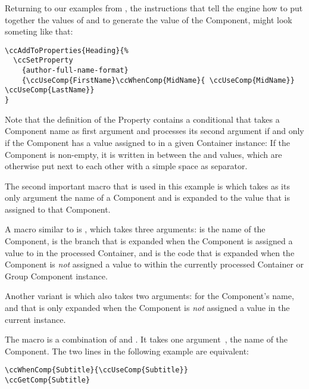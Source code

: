 Returning to our examples from , the
instructions that tell the engine how to put together the values of
 and  to generate
the value of the  Component, might look
someting like that:
\begin{lstlisting}[style=tex]
\ccAddToProperties{Heading}{%
  \ccSetProperty
    {author-full-name-format}
    {\ccUseComp{FirstName}\ccWhenComp{MidName}{ \ccUseComp{MidName}} \ccUseComp{LastName}}
}
\end{lstlisting}
Note that the definition of the Property
 contains a conditional
\UsageMacro{\ccWhenComp} that takes a Component name as first argument
 and processes its second argument  if and
only if the Component has a value assigned to in a given Container
instance: If the  Component is non-empty, it
is written in between the  and
 values, which are otherwise put next to
each other with a simple space as separator.

The second important macro that is used in this example is
\DeclareMacro{\ccUseComp} which takes as its only argument
 the name of a Component and is expanded to the value
that is assigned to that Component.

A macro similar to \UsageMacro{\ccWhenComp} is
\DeclareMacro{\ccIfComp}, which takes three arguments: 
is the name of the Component,  is the branch that is
expanded when the Component is assigned a value to in the processed
Container, and  is the code that is expanded when the
Component is \textit{not} assigned a value to within the currently
processed Container or Group Component instance.

Another variant is \DeclareMacro{\ccUnlessComp} which also takes two
arguments:  for the Component's name, and 
that is only expanded when the Component is \textit{not} assigned a
value in the current instance.

The macro \DeclareMacro{\ccGetComp} is a combination of
\UsageMacro{\ccWhenComp} and \UsageMacro{\ccUseComp}. It takes one
argument~, the name of the Component. The two lines in the
following example are equivalent:
\begin{lstlisting}
\ccWhenComp{Subtitle}{\ccUseComp{Subtitle}}
\ccGetComp{Subtitle}
\end{lstlisting}






